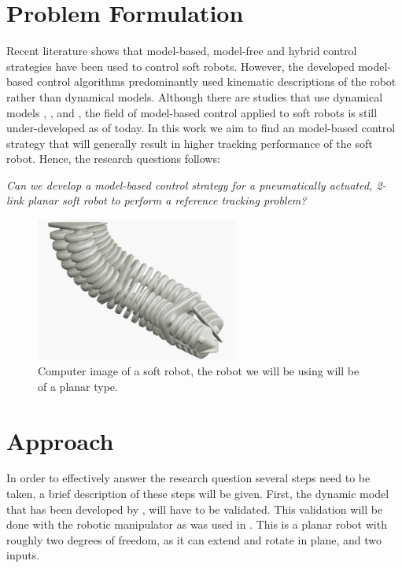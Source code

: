 \section{Problem Formulation}


Recent literature shows that model-based, model-free and hybrid control strategies have been used to control soft robots. However, the developed model-based control algorithms predominantly used kinematic descriptions of the robot rather than dynamical models. Although there are studies that use dynamical models  \cite{falkenhahn2016dynamic}, \cite{della2020model}, and \cite{kapadia2011task}, the field of model-based control applied to soft robots is still under-developed as of today. In this work we aim to find an model-based control strategy that will generally result in higher tracking performance of the soft robot. Hence, the research questions follows:



\textit{Can we develop a model-based control strategy for a pneumatically actuated, 2-link planar soft robot to perform a reference tracking problem?}




\begin{figure}[H]
    \centering
    \includegraphics[width = 0.6\textwidth]{Figures/sorotoki1.png}
    \caption{Computer image of a soft robot, the robot we will be using will be of a planar type.}
    \label{fig:sorotoki}
\end{figure}


\section{Approach}

In order to effectively answer the research question several steps need to be taken, a brief description of these steps will be given. First, the dynamic model that has been developed by \cite{caasenbrood2020}, will have to be validated. This validation will be done with the robotic manipulator as was used in \cite{berkers}. This is a planar robot with roughly two degrees of freedom, as it can extend and rotate in plane, and two inputs.

